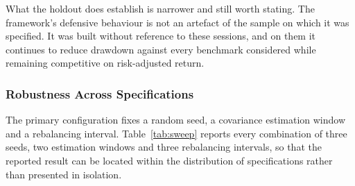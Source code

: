 \documentclass{singlecol-new}
\theoremstyle{TH}{
\newtheorem{lemma}{Lemma}
\newtheorem{theorem}[lemma]{Theorem}
\newtheorem{corrolary}[lemma]{Corrolary}
\newtheorem{conjecture}[lemma]{Conjecture}
\newtheorem{proposition}[lemma]{Proposition}
\newtheorem{claim}[lemma]{Claim}
\newtheorem{stheorem}[lemma]{Wrong Theorem}
\newtheorem{algorithm}{Algorithm}
}
\theoremstyle{THrm}{
\newtheorem{definition}{Definition}[section]
\newtheorem{question}{Question}[section]
\newtheorem{remark}{Remark}
\newtheorem{scheme}{Scheme}
}
\theoremstyle{THhit}{
\newtheorem{case}{Case}[section]
}
\begin{document}
What the holdout does establish is narrower and still worth stating. The framework's
defensive behaviour is not an artefact of the sample on which it was specified. It was
built without reference to these sessions, and on them it continues to reduce drawdown
against every benchmark considered while remaining competitive on risk-adjusted return.

\subsubsection{Robustness Across Specifications}
\label{sec:robust}

The primary configuration fixes a random seed, a covariance estimation window and a
rebalancing interval. Table~\ref{tab:sweep} reports every combination of three seeds, two
estimation windows and three rebalancing intervals, so that the reported result can be
located within the distribution of specifications rather than presented in isolation.
\end{document}
